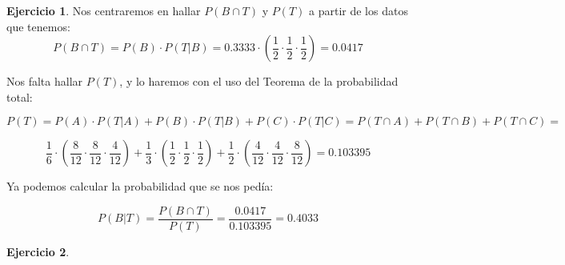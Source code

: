 \documentclass[a4paper, 12pt]{article}
\theoremstyle{definition}
\newtheorem{ej}{Ejercicio}
\begin{document}
\begin{ej}
Nos centraremos en hallar $P(B \cap T)$ y $P(T)$ a partir de los datos que tenemos:
\[
    P(B \cap T) = P(B) \cdot P(T|B) = 0.3333 \cdot \left(\frac{1}{2} \cdot \dfrac{1}{2} \cdot \frac{1}{2} \right) = 0.0417 
\]

Nos falta hallar $P(T)$, y lo haremos con el uso del Teorema de la probabilidad total:

\begin{center}
    $P(T) = P(A) \cdot P(T|A) + P(B) \cdot P(T|B) + P(C) \cdot P(T|C) = P(T \cap A) + P(T \cap B) + P(T \cap C) = $
\end{center}

\[
    \frac{1}{6}\cdot \left(\frac{8}{12} \cdot \dfrac{8}{12} \cdot \frac{4}{12} \right) + \frac{1}{3} \cdot \left(\frac{1}{2} \cdot \dfrac{1}{2} \cdot \frac{1}{2} \right) + \frac{1}{2} \cdot \left(\frac{4}{12} \cdot \dfrac{4}{12} \cdot \frac{8}{12} \right) = 0.103395
\]

Ya podemos calcular la probabilidad que se nos pedía:

\[
    P(B|T) = \frac{P(B \cap T)}{P(T)} = \frac{0.0417}{0.103395} = 0.4033
\]
\end{ej}

\begin{ej}
\end{ej}
\end{document}
